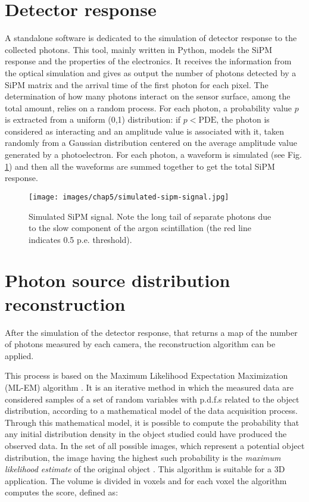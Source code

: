 \section{Detector response}
A standalone software is dedicated to the simulation of detector response to the collected photons. This tool, mainly written in Python, models the SiPM response and the properties of the electronics. It receives the information from the optical simulation and gives as output the number of photons detected by a SiPM matrix and the arrival time of the first photon for each pixel. The determination of how many photons interact on the sensor surface, among the total amount, relies on a random process. For each photon, a probability value $p$ is extracted from a uniform (0,1) distribution: if $p< \text{PDE}$, the photon is considered as interacting and an amplitude value is associated with it, taken randomly from a Gaussian distribution centered on the average amplitude value generated by a photoelectron. For each photon, a waveform is simulated (see Fig. \ref{fig:simulated-signal}) and then all the waveforms are summed together to get the total SiPM response.

\begin{figure}
    \centering
    \texttt{[image: images/chap5/simulated-sipm-signal.jpg]}
    \caption{Simulated SiPM signal. Note the long tail of separate photons due to the slow component of the argon scintillation (the red line indicates 0.5  p.e. threshold).}
    \label{fig:simulated-signal}
\end{figure}

\section{Photon source distribution reconstruction}
After the simulation of the detector response, that returns a map of the number of photons measured by each camera, the reconstruction algorithm can be applied. 

This process is based on the Maximum Likelihood Expectation Maximization (ML-EM) algorithm \cite{ML-EM}. It is an iterative method in which the measured data are considered samples of a set of random variables with p.d.f.s related to the object distribution, according to a mathematical model of the data acquisition process. Through this mathematical model, it is possible to compute the probability that any initial distribution density in the object studied could have produced the observed data. In the set of all possible images, which represent a potential object distribution, the image having the highest such probability is the \textit{maximum likelihood estimate} of the original object \cite{tesi-cicero}. This algorithm is suitable for a 3D application.
The volume is divided in voxels and for each voxel the algorithm computes the score, defined as:

